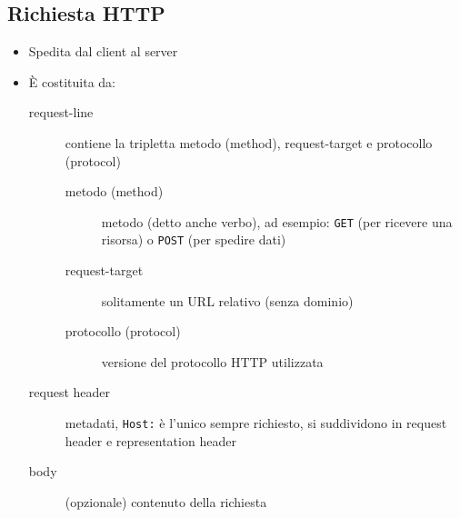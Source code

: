 \documentclass{beamer}
\newcommand{\code}[1]{\mbox{\texttt{#1}}}
\begin{document}
\subsection*{Richiesta HTTP}
\begin{frame}[allowframebreaks]{\insertsection}{\insertsubsection}
\begin{itemize}
\item Spedita dal \alert{client} al \alert{server}
\item È costituita da:
\begin{description}
\item[request-line] contiene la tripletta \alert{metodo (method)},
\alert{request-target} e \alert{protocollo (protocol)}
\begin{description}
\item[metodo (method)] metodo (detto anche verbo), ad esempio:
\code{GET} (per ricevere una risorsa) o \code{POST} (per spedire dati)
\item[request-target] solitamente un URL relativo (senza dominio)
\item[protocollo (protocol)] versione del protocollo HTTP utilizzata
\end{description}
\item[request header] metadati, \code{Host:} è l'unico sempre richiesto, si
suddividono in \alert{request header} e \alert{representation header}
\item[body] (opzionale) contenuto della richiesta
\end{description}
\end{itemize}
\end{frame}
\end{document}
